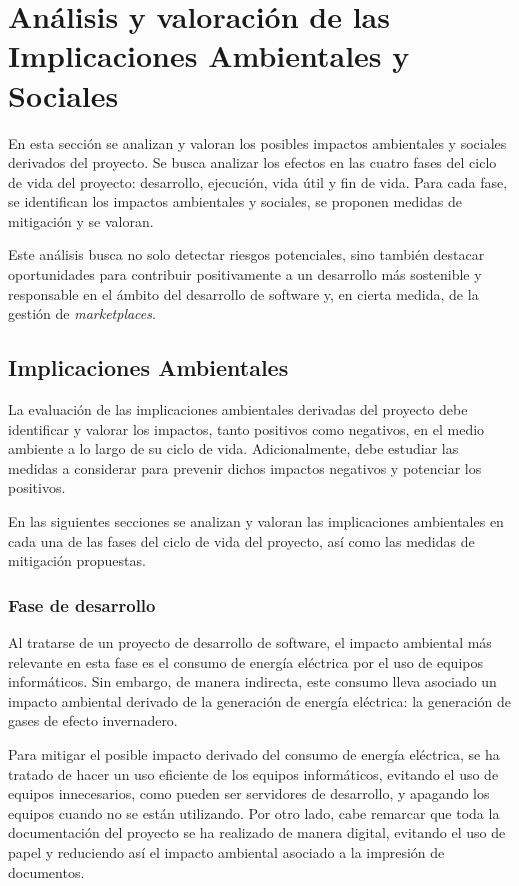 \chapter{Análisis y valoración de las Implicaciones Ambientales y Sociales}
\label{ch:ambiental_social}

En esta sección se analizan y valoran los posibles impactos ambientales y sociales derivados del proyecto. Se busca analizar los efectos en las cuatro fases del ciclo de vida del proyecto: desarrollo, ejecución, vida útil y fin de vida. Para cada fase, se identifican los impactos ambientales y sociales, se proponen medidas de mitigación y se valoran.

Este análisis busca no solo detectar riesgos potenciales, sino también destacar oportunidades para contribuir positivamente a un desarrollo más sostenible y responsable en el ámbito del desarrollo de software y, en cierta medida, de la gestión de \textit{marketplaces}.


\section{Implicaciones Ambientales}
\label{as:sec:ambiental}

La evaluación de las implicaciones ambientales derivadas del proyecto debe identificar y valorar los impactos, tanto positivos como negativos, en el medio ambiente a lo largo de su ciclo de vida. Adicionalmente, debe estudiar las medidas a considerar para prevenir dichos impactos negativos y potenciar los positivos.

En las siguientes secciones se analizan y valoran las implicaciones ambientales en cada una de las fases del ciclo de vida del proyecto, así como las medidas de mitigación propuestas.

\subsection{Fase de desarrollo}

Al tratarse de un proyecto de desarrollo de software, el impacto ambiental más relevante en esta fase es el consumo de energía eléctrica por el uso de equipos informáticos. Sin embargo, de manera indirecta, este consumo lleva asociado un impacto ambiental derivado de la generación de energía eléctrica: la generación de gases de efecto invernadero.

Para mitigar el posible impacto derivado del consumo de energía eléctrica, se ha tratado de hacer un uso eficiente de los equipos informáticos, evitando el uso de equipos innecesarios, como pueden ser servidores de desarrollo, y apagando los equipos cuando no se están utilizando. Por otro lado, cabe remarcar que toda la documentación del proyecto se ha realizado de manera digital, evitando el uso de papel y reduciendo así el impacto ambiental asociado a la impresión de documentos.

